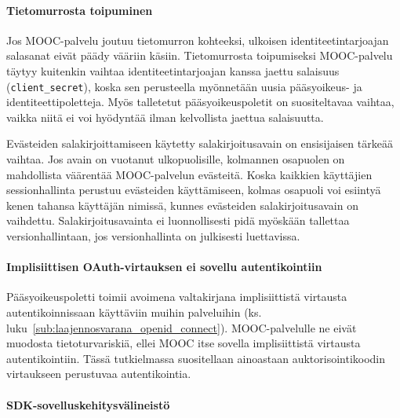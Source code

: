 \documentclass[finnish,gradu]{tktltiki}
\begin{document}

  \paragraph{Tietomurrosta toipuminen} \hfill %
  \label{par:tietomurrosta_toipuminen}

  Jos MOOC-palvelu joutuu tietomurron kohteeksi, ulkoisen identiteetintarjoajan salasanat eivät päädy vääriin käsiin. Tietomurrosta toipumiseksi MOOC-palvelu täytyy kuitenkin vaihtaa identiteetintarjoajan kanssa jaettu salaisuus (\verb!client_secret!), koska sen perusteella myönnetään uusia pääsyoikeus- ja identiteettipoletteja. Myös talletetut pääsyoikeuspoletit on suositeltavaa vaihtaa, vaikka niitä ei voi hyödyntää ilman kelvollista jaettua salaisuutta.

  Evästeiden salakirjoittamiseen käytetty salakirjoitusavain on ensisijaisen tärkeää vaihtaa. Jos avain on vuotanut ulkopuolisille, kolmannen osapuolen on mahdollista väärentää MOOC-palvelun evästeitä. Koska kaikkien käyttäjien sessionhallinta perustuu evästeiden käyttämiseen, kolmas osapuoli voi esiintyä kenen tahansa käyttäjän nimissä, kunnes evästeiden salakirjoitusavain on vaihdettu. Salakirjoitusavainta ei luonnollisesti pidä myöskään tallettaa versionhallintaan, jos versionhallinta on julkisesti luettavissa.


  \paragraph{Implisiittisen OAuth-virtauksen ei sovellu autentikointiin} %
  \label{par:implisiittisen_oauth_virtauksen_ei_sovellu_autentikointiin}

  Pääsyoikeuspoletti toimii avoimena valtakirjana implisiittistä virtausta autentikoinnissaan käyttäviin muihin palveluihin (ks. luku~\ref{sub:laajennosvarana_openid_connect}). MOOC-palvelulle ne eivät muodosta tietoturvariskiä, ellei MOOC itse sovella implisiittistä virtausta autentikointiin. Tässä tutkielmassa suositellaan ainoastaan auktorisointikoodin virtaukseen perustuvaa autentikointia.



  \paragraph{SDK-sovelluskehitysvälineistö} \hfill %
  \label{par:sdk_sovelluskehitysvälineistö}
\end{document}
